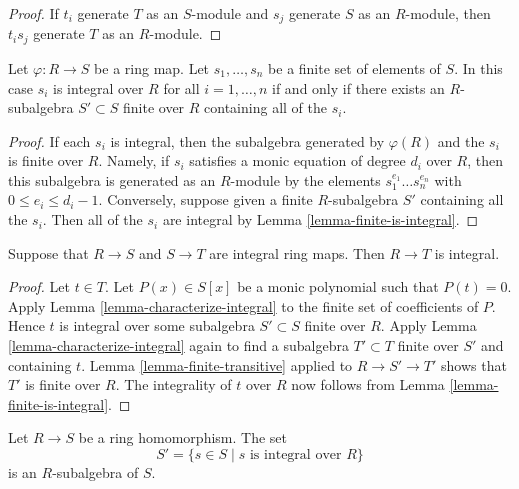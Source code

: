 \begin{proof}
If $t_i$ generate $T$ as an $S$-module and $s_j$ generate $S$ as an
$R$-module, then $t_i s_j$ generate $T$ as an $R$-module.
\end{proof}

\begin{lemma}
\label{lemma-characterize-integral}
Let $\varphi : R \to S$ be a ring map. Let $s_1, \ldots, s_n$
be a finite set of elements of $S$.
In this case $s_i$ is integral over $R$ for all $i = 1, \ldots, n$
if and only if
there exists an $R$-subalgebra $S' \subset S$ finite over $R$
containing all of the $s_i$.
\end{lemma}

\begin{proof}
If each $s_i$ is integral, then the subalgebra
generated by $\varphi(R)$ and the $s_i$ is finite
over $R$. Namely, if $s_i$ satisfies a monic equation
of degree $d_i$ over $R$, then this subalgebra is generated as an
$R$-module by the elements $s_1^{e_1} \ldots s_n^{e_n}$
with $0 \leq e_i \leq d_i - 1$.
Conversely, suppose given a finite $R$-subalgebra
$S'$ containing all the $s_i$. Then all of the
$s_i$ are integral by Lemma \ref{lemma-finite-is-integral}.
\end{proof}

\begin{lemma}
\label{lemma-integral-transitive}
Suppose that $R \to S$ and $S \to T$ are integral
ring maps. Then $R \to T$ is integral.
\end{lemma}

\begin{proof}
Let $t \in T$. Let $P(x) \in S[x]$ be a
monic polynomial such that $P(t) = 0$.
Apply Lemma \ref{lemma-characterize-integral}
to the finite set of coefficients of $P$.
Hence $t$ is integral over some subalgebra
$S' \subset S$ finite over $R$. Apply Lemma
\ref{lemma-characterize-integral} again to find
a subalgebra $T' \subset T$ finite over $S'$ and
containing $t$. Lemma \ref{lemma-finite-transitive}
applied to $R \to S' \to T'$ shows that $T'$ is finite
over $R$. The integrality of $t$ over $R$
now follows from Lemma \ref{lemma-finite-is-integral}.
\end{proof}

\begin{lemma}
\label{lemma-integral-closure-is-ring}
Let $R \to S$ be a ring homomorphism.
The set
$$
S' = \{s \in S \mid s\text{ is integral over }R\}
$$
is an $R$-subalgebra of $S$.
\end{lemma}

